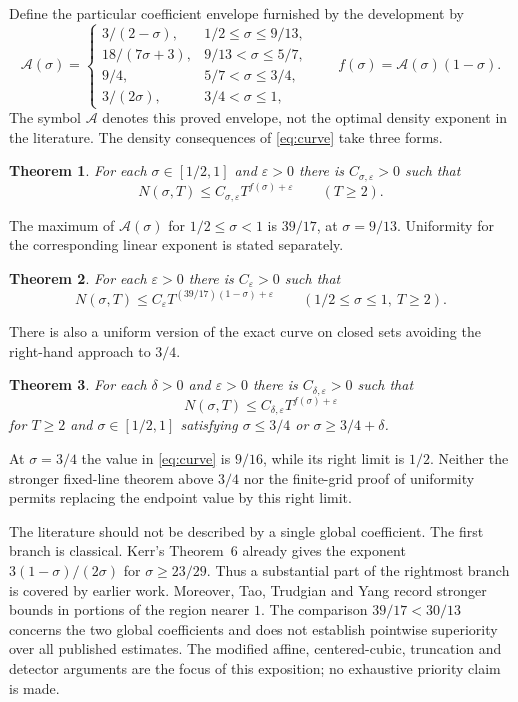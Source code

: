 \documentclass[11pt,a4paper,oneside]{article}
\newtheorem{theorem}{Theorem}[section]
\theoremstyle{definition}
\newcommand{\eps}{\varepsilon}
\numberwithin{equation}{section}
\begin{document}
Define the particular coefficient envelope furnished by the development by
\begin{equation}\label{eq:curve}
 \mathcal A(\sigma)=
 \begin{cases}
  3/(2-\sigma),&1/2\le\sigma\le9/13,\\
  18/(7\sigma+3),&9/13<\sigma\le5/7,\\
  9/4,&5/7<\sigma\le3/4,\\
  3/(2\sigma),&3/4<\sigma\le1,
 \end{cases}
 \qquad f(\sigma)=\mathcal A(\sigma)(1-\sigma).
\end{equation}
The symbol $\mathcal A$ denotes this proved envelope, not the optimal density exponent in the literature. The density consequences of \eqref{eq:curve} take three forms.
\begin{theorem}\label{thm:full}
For each $\sigma\in[1/2,1]$ and $\eps>0$ there is $C_{\sigma,\eps}>0$ such that
\[
 N(\sigma,T)\le C_{\sigma,\eps}T^{f(\sigma)+\eps}
 \qquad(T\ge2).
\]
\end{theorem}
The maximum of $\mathcal A(\sigma)$ for $1/2\le\sigma<1$ is $39/17$, at $\sigma=9/13$. Uniformity for the corresponding linear exponent is stated separately.
\begin{theorem}\label{thm:global}
For each $\eps>0$ there is $C_\eps>0$ such that
\[
 N(\sigma,T)\le C_\eps T^{(39/17)(1-\sigma)+\eps}
 \qquad(1/2\le\sigma\le1,\ T\ge2).
\]
\end{theorem}
There is also a uniform version of the exact curve on closed sets avoiding the right-hand approach to $3/4$.
\begin{theorem}\label{thm:away}
For each $\delta>0$ and $\eps>0$ there is $C_{\delta,\eps}>0$ such that
\[
 N(\sigma,T)\le C_{\delta,\eps}T^{f(\sigma)+\eps}
\]
for $T\ge2$ and $\sigma\in[1/2,1]$ satisfying $\sigma\le3/4$ or $\sigma\ge3/4+\delta$.
\end{theorem}
At $\sigma=3/4$ the value in \eqref{eq:curve} is $9/16$, while its right limit is $1/2$. Neither the stronger fixed-line theorem above $3/4$ nor the finite-grid proof of uniformity permits replacing the endpoint value by this right limit.

The literature should not be described by a single global coefficient. The first branch is classical. Kerr's Theorem~6 \cite{Kerr} already gives the exponent $3(1-\sigma)/(2\sigma)$ for $\sigma\ge23/29$. Thus a substantial part of the rightmost branch is covered by earlier work. Moreover, Tao, Trudgian and Yang \cite{TaoTrudgianYang} record stronger bounds in portions of the region nearer $1$. The comparison $39/17<30/13$ concerns the two global coefficients and does not establish pointwise superiority over all published estimates. The modified affine, centered-cubic, truncation and detector arguments are the focus of this exposition; no exhaustive priority claim is made.
\end{document}
